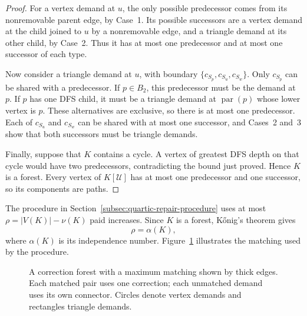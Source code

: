 \documentclass[11pt]{amsart}
\newcommand{\1}{\mathbbm{1}}
\begin{document}
\begin{proof}
For a vertex demand at $u$, the only possible predecessor
comes from its nonremovable parent edge, by Case~1.
Its possible successors are a vertex demand at the child
joined to $u$ by a nonremovable edge, and a triangle demand
at its other child, by Case~2.
Thus it has at most one predecessor and at most one
successor of each type.

Now consider a triangle demand at $u$, with boundary
$\{c_{S_p},c_{S_u},c_{S_w}\}$.
Only $c_{S_p}$ can be shared with a predecessor.
If $p\in B_2$, this predecessor must be the demand at $p$.
If $p$ has one DFS child, it must be a triangle demand
at $\operatorname{par}(p)$ whose lower vertex is $p$.
These alternatives are exclusive, so there is at most
one predecessor.
Each of $c_{S_u}$ and $c_{S_w}$ can be shared with at most
one successor, and Cases~2 and~3 show that both successors
must be triangle demands.

Finally, suppose that $K$ contains a cycle.
A vertex of greatest DFS depth on that cycle would have
two predecessors, contradicting the bound just proved.
Hence $K$ is a forest.
Every vertex of $K[\mathcal U]$ has at most one predecessor
and one successor, so its components are paths.
\end{proof}



The procedure in Section~\ref{subsec:quartic-repair-procedure} uses
at most $\rho=|V(K)|-\nu(K)$ paid increases. Since $K$ is a forest,
K\H onig's theorem gives
\[
 \rho=\alpha(K),
\]
where $\alpha(K)$ is its independence number.
Figure~\ref{fig:quartic-forest} illustrates the matching used by
the procedure.

\begin{figure}[H]
\centering
{}
\caption{A correction forest with a maximum matching shown by thick
edges. Each matched pair uses one correction; each unmatched demand
uses its own connector. Circles denote vertex demands and rectangles
triangle demands.}
\label{fig:quartic-forest}
\end{figure}
\end{document}
